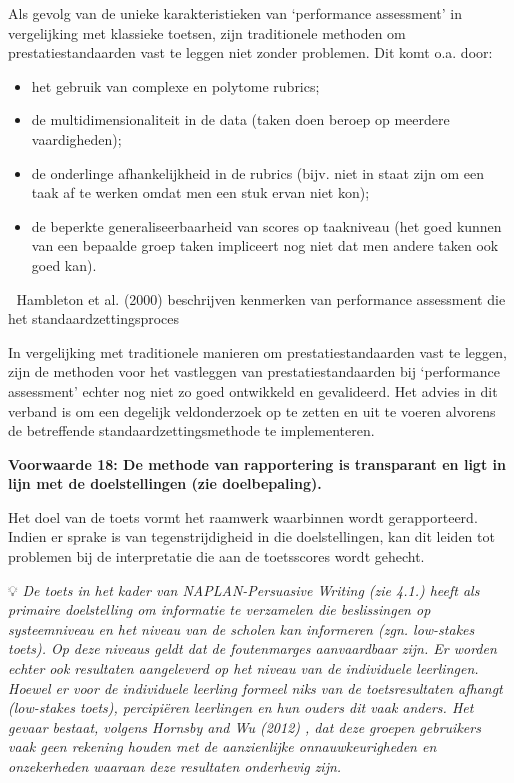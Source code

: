 \documentclass[
  letterpaper,
]{report}
\providecommand{\tightlist}{%
  \setlength{\itemsep}{0pt}\setlength{\parskip}{0pt}}
\begin{document}
Als gevolg van de unieke karakteristieken van `performance assessment'
in vergelijking met klassieke toetsen, zijn traditionele methoden om
prestatiestandaarden vast te leggen niet zonder problemen. Dit komt o.a.
door:

\begin{itemize}
\tightlist
\item
  het gebruik van complexe en polytome rubrics;
\item
  de multidimensionaliteit in de data (taken doen beroep op meerdere
  vaardigheden);
\item
  de onderlinge afhankelijkheid in de rubrics (bijv. niet in staat zijn
  om een taak af te werken omdat men een stuk ervan niet kon);
\item
  de beperkte generaliseerbaarheid van scores op taakniveau (het goed
  kunnen van een bepaalde groep taken impliceert nog niet dat men andere
  taken ook goed kan).
\end{itemize}

📖 Hambleton et al. (2000) beschrijven kenmerken van performance
assessment die het standaardzettingsproces

In vergelijking met traditionele manieren om prestatiestandaarden vast
te leggen, zijn de methoden voor het vastleggen van prestatiestandaarden
bij `performance assessment' echter nog niet zo goed ontwikkeld en
gevalideerd. Het advies in dit verband is om een degelijk veldonderzoek
op te zetten en uit te voeren alvorens de betreffende
standaardzettingsmethode te implementeren.

\textbf{Voorwaarde 18: De methode van rapportering is transparant en
ligt in lijn met de doelstellingen (zie doelbepaling).}

Het doel van de toets vormt het raamwerk waarbinnen wordt gerapporteerd.
Indien er sprake is van tegenstrijdigheid in die doelstellingen, kan dit
leiden tot problemen bij de interpretatie die aan de toetsscores wordt
gehecht.

💡 \emph{De toets in het kader van NAPLAN-Persuasive Writing (zie 4.1.)
heeft als primaire doelstelling om informatie te verzamelen die
beslissingen op systeemniveau en het niveau van de scholen kan
informeren (zgn. low-stakes toets). Op deze niveaus geldt dat de
foutenmarges aanvaardbaar zijn. Er worden echter ook resultaten
aangeleverd op het niveau van de individuele leerlingen. Hoewel er voor
de individuele leerling formeel niks van de toetsresultaten afhangt
(low-stakes toets), percipiëren leerlingen en hun ouders dit vaak
anders. Het gevaar bestaat, volgens Hornsby and Wu (2012) , dat deze
groepen gebruikers vaak geen rekening houden met de aanzienlijke
onnauwkeurigheden en onzekerheden waaraan deze resultaten onderhevig
zijn.}
\end{document}
